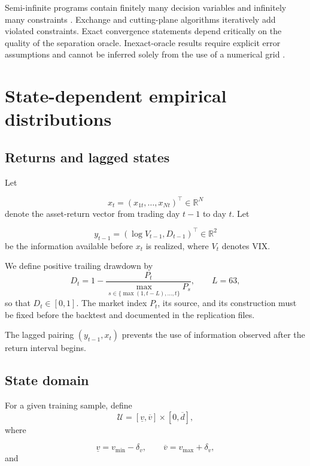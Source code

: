 \documentclass[11pt,a4paper]{article}
\theoremstyle{definition}
\theoremstyle{remark}
\newcommand{\R}{\mathbb{R}}
\newcommand{\U}{\mathcal{U}}
\begin{document}
Semi-infinite programs contain finitely many decision variables and
infinitely many constraints
\citep{hettich1993semi,lopez2007semi}.
Exchange and cutting-plane algorithms iteratively add violated constraints.
Exact convergence statements depend critically on the quality of the
separation oracle. Inexact-oracle results require explicit error assumptions
and cannot be inferred solely from the use of a numerical grid
\citep{oustry2025convex}.

\section{State-dependent empirical distributions}

\subsection{Returns and lagged states}

Let

\[
x_t=(x_{1t},\ldots,x_{Nt})^\top\in\R^N
\]
denote the asset-return vector from trading day \(t-1\) to day \(t\).
Let

\[
y_{t-1}=(\log V_{t-1},D_{t-1})^\top\in\R^2
\]
be the information available before \(x_t\) is realized, where \(V_t\)
denotes VIX.

We define positive trailing drawdown by
\begin{equation}
D_t
=
1-
\frac{P_t}
{\max_{s\in\{\max(1,t-L),\ldots,t\}}P_s},
\qquad L=63,
\label{eq:drawdown}
\end{equation}
so that \(D_t\in[0,1]\). The market index \(P_t\), its source, and its
construction must be fixed before the backtest and documented in the
replication files.

The lagged pairing \((y_{t-1},x_t)\) prevents the use of information observed
after the return interval begins.

\subsection{State domain}

For a given training sample, define
\begin{equation}
\U
=
[\underline v,\overline v]
\times
[0,\overline d],
\label{eq:state-domain}
\end{equation}
where

\[
\underline v
=
v_{\min}-\delta_v,\qquad
\overline v
=
v_{\max}+\delta_v,
\]
and
\end{document}

